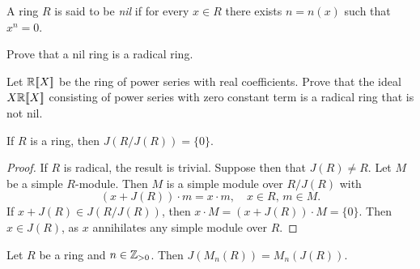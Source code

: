 
\begin{definition}
A ring $R$ is said to be \emph{nil} if for every $x\in R$ there
exists $n=n(x)$ such that $x^n=0$. 
\end{definition}

\begin{exercise}
    Prove that a nil ring is a radical ring. 
\end{exercise}

\begin{exercise}
    Let $\mathbb{R}[\![X]\!]$ be the ring of power series with real coefficients. Prove that the ideal 
    $X\mathbb{R}[\![X]\!]$ consisting of power series with zero constant term is a radical ring
    that is not nil. 
\end{exercise}

\begin{theorem}
	\label{thm:J(R/J)=0}
	If $R$ is a ring, then $J(R/J(R))=\{0\}$.
\end{theorem}

\begin{proof}
	If $R$ is radical, the result is trivial. Suppose then that 
	$J(R)\ne R$. Let $M$ be a simple $R$-module. Then $M$ is 
	a simple module over $R/J(R)$ with 
	\[
		(x+J(R))\cdot m=x\cdot m,\quad
		x\in R,\,m\in M.
	\]
	If $x+J(R)\in J(R/J(R))$, then  $x\cdot M=(x+J(R))\cdot M=\{0\}$. Then $x\in J(R)$, as 
	$x$ annihilates any simple module over $R$.
\end{proof}

\begin{theorem}
	Let $R$ be a ring and $n\in\mathbb{Z}_{>0}$. Then $J(M_n(R))=M_n(J(R))$. 
\end{theorem}

